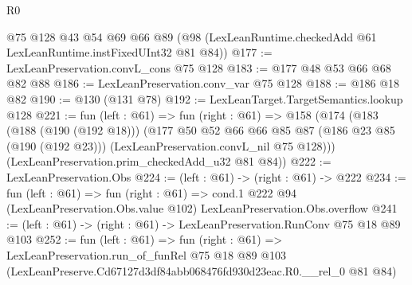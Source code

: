 \begin{lexlean}{R0}
\begin{coremodule}
    @75
    @128
    @43
    @54
    @69
    @66
    @89
    (@98 (LexLeanRuntime.checkedAdd @61 LexLeanRuntime.instFixedUInt32 @81 @84))
@177 := LexLeanPreservation.convL_cons @75 @128
@183 := @177 @48 @53 @66 @68 @82 @88
@186 := LexLeanPreservation.conv_var @75 @128
@188 := @186 @18 @82
@190 := @130 (@131 @78)
@192 := LexLeanTarget.TargetSemantics.lookup @128
@221 := fun (left : @61) =>
  fun (right : @61) =>
  @158
    (@174
      (@183
        (@188 (@190 (@192 @18)))
        (@177
          @50
          @52
          @66
          @66
          @85
          @87
          (@186 @23 @85 (@190 (@192 @23)))
          (LexLeanPreservation.convL_nil @75 @128)))
      (LexLeanPreservation.prim_checkedAdd_u32 @81 @84))
@222 := LexLeanPreservation.Obs
@224 := (left : @61) -> (right : @61) -> @222
@234 := fun (left : @61) =>
  fun (right : @61) =>
  cond.{1} @222 @94 (LexLeanPreservation.Obs.value @102) LexLeanPreservation.Obs.overflow
@241 := (left : @61) -> (right : @61) -> LexLeanPreservation.RunConv @75 @18 @89 @103
@252 := fun (left : @61) =>
  fun (right : @61) =>
  LexLeanPreservation.run_of_funRel
    @75
    @18
    @89
    @103
    (LexLeanPreserve.Cd67127d3df84abb068476fd930d23eac.R0.__rel_0 @81 @84)
\end{coremodule}
\end{lexlean}
